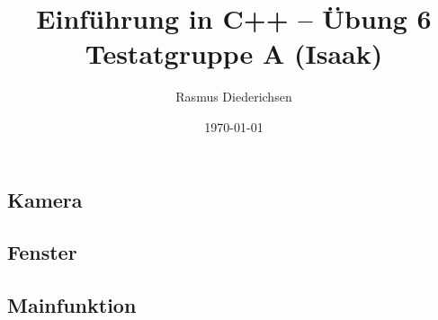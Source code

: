 \documentclass{article}
\title{Einführung in C++ -- Übung 6 \\ Testatgruppe A (Isaak)}
\author{Rasmus Diederichsen}
\date{\today}
\begin{document}
   \maketitle

   \setcounter{section}{6}

   \subsection{Kamera}
   
   
   

   \subsection{Fenster}
   
   
   

   \subsection{Mainfunktion}
   
   
\end{document}

